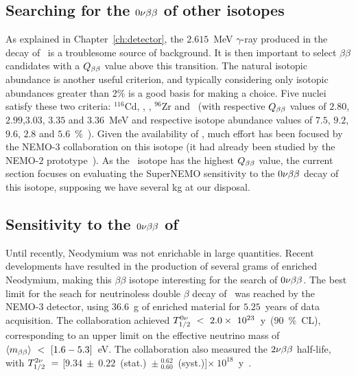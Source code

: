 \subsection{Searching for the $0\nu\beta\beta$ of other isotopes}

As explained in Chapter~\ref{ch:detector}, the $2.615$~MeV $\gamma$-ray produced in the decay of \Tl\ is a troublesome source of background.
It is then important to select $\beta\beta$ candidates with a $Q_{\beta\beta}$ value above this transition.
The natural isotopic abundance is another useful criterion, and typically considering only isotopic abundances greater than 2\% is a good basis for making a choice.
Five nuclei satisfy these two criteria: $^{116}$Cd, \Se, \Mo, $^{96}$Zr and \Nd\ (with respective $Q_{\beta\beta}$ values of $2.80$, $2.99$,$3.03$, $3.35$ and $3.36$~MeV and respective isotope abundance values of $7.5$, $9.2$, $9.6$, $2.8$ and $5.6$~\%~\cite{art:atomic_mass}).
Given the availability of \Mo, much effort has been focused by the NEMO-$3$ collaboration on this isotope (it had already been studied by the NEMO-$2$ prototype~\cite{art:NEMO2}).
As the \Nd\ isotope has the highest $Q_{\beta\beta}$ value, the current section focuses on evaluating the SuperNEMO sensitivity to the $0\nu\beta\beta$ decay of this isotope, supposing we have several kg at our disposal.

\subsection{Sensitivity to the $0\nu\beta\beta$ of \Nd}

Until recently, Neodymium was not enrichable in large quantities.
Recent developments have resulted in the production of several grams of enriched Neodymium, making this $\beta\beta$ isotope interesting for the search of $0\nu\beta\beta$.
The best limit for the seach for neutrinoless double $\beta$ decay of \Nd\ was reached by the NEMO-$3$ detector, using $36.6$~g of enriched material for $5.25$~years of data acquisition.
The collaboration achieved $T_{1/2}^{0\nu}~<~2.0\times~10^{23}$~y~($90$~\%~CL), corresponding to an upper limit on the effective neutrino mass of $\langle m_{\beta\beta}\rangle~<~[1.6-5.3]$~eV.
The collaboration also measured the $2\nu\beta\beta$ half-life, with $T_{1/2}^{2\nu}~=~$[$9.34~\pm~0.22$~(stat.)~$\pm~^{0.62}_{0.60}$~(syst.)]$\times~10^{18}$~y~\cite{art:NEMO3_Nd}.

